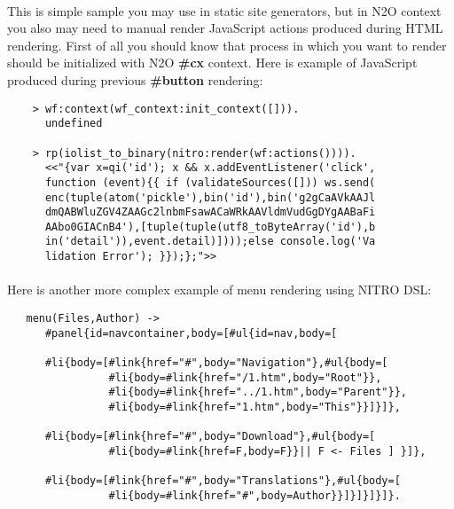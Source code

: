 \paragraph{}
This is simple sample you may use in static site generators, but in N2O context
you also may need to manual render JavaScript actions produced during HTML rendering.
First of all you should know that process in which you want to render should be
initialized with N2O {\bf \#cx} context. Here is example of JavaScript
produced during previous {\bf \#button} rendering:

\vspace{1\baselineskip}
\begin{lstlisting}
    > wf:context(wf_context:init_context([])).
      undefined

    > rp(iolist_to_binary(nitro:render(wf:actions()))).
      <<"{var x=qi('id'); x && x.addEventListener('click',
      function (event){{ if (validateSources([])) ws.send(
      enc(tuple(atom('pickle'),bin('id'),bin('g2gCaAVkAAJl
      dmQABWluZGV4ZAAGc2lnbmFsawACaWRkAAVldmVudGgDYgAABaFi
      AAbo0GIACnB4'),[tuple(tuple(utf8_toByteArray('id'),b
      in('detail')),event.detail)])));else console.log('Va
      lidation Error'); }});};">>
\end{lstlisting}
\vspace{1\baselineskip}

\newpage
\paragraph{}
Here is another more complex example of menu rendering using NITRO DSL:

\vspace{1\baselineskip}
\begin{lstlisting}
   menu(Files,Author) ->
      #panel{id=navcontainer,body=[#ul{id=nav,body=[

      #li{body=[#link{href="#",body="Navigation"},#ul{body=[
                #li{body=#link{href="/1.htm",body="Root"}},
                #li{body=#link{href="../1.htm",body="Parent"}},
                #li{body=#link{href="1.htm",body="This"}}]}]},

      #li{body=[#link{href="#",body="Download"},#ul{body=[
                #li{body=#link{href=F,body=F}}|| F <- Files ] }]},

      #li{body=[#link{href="#",body="Translations"},#ul{body=[
                #li{body=#link{href="#",body=Author}}]}]}]}]}.
\end{lstlisting}
\vspace{1\baselineskip}

